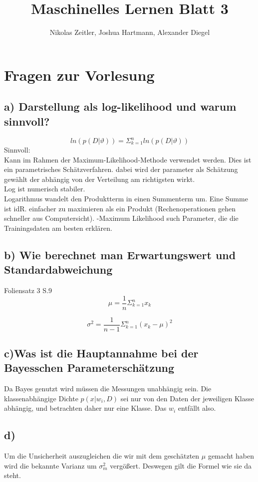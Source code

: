 \documentclass{scrartcl}
\author{Nikolas Zeitler, Joshua Hartmann, Alexander Diegel}
\title{Maschinelles Lernen Blatt 3}
\begin{document}
\maketitle
\section{Fragen zur Vorlesung}
\subsection*{a) Darstellung als log-likelihood und warum sinnvoll?}
\[ ln (p(D|\vartheta)) = \Sigma^n_{k=1} ln (p(D|\vartheta)) \]
Sinnvoll: \\
Kann im Rahmen der Maximum-Likelihood-Methode verwendet werden. Dies ist ein parametrisches Schätzverfahren. dabei wird der parameter als Schätzung gewählt der abhängig von der Verteilung am richtigsten wirkt.\\
Log ist numerisch stabiler.  \\
Logarithmus wandelt den Produktterm in einen Summenterm um. Eine Summe ist idR. einfacher zu maximieren 
als ein Produkt (Rechenoperationen gehen schneller aus Computersicht). -Maximum Likelihood such Parameter, die die Trainingsdaten am besten erklären.
\subsection*{b) Wie berechnet man Erwartungswert und Standardabweichung}
Foliensatz 3 S.9 \\
\[\mu = \frac{1}{n}\Sigma^n_{k=1}x_k \]

\[\sigma^2 = \frac{1}{n-1}\Sigma^n_{k=1}(x_k-\mu)^2 \]

\subsection*{c)Was ist die Hauptannahme bei der Bayesschen Parameterschätzung}
Da Bayes genutzt wird müssen die Messungen unabhängig sein.%
Die klassenabhängige Dichte $p(x|w_i,D)$ sei nur von den Daten der jeweiligen Klasse abhängig, und betrachten daher nur eine Klasse. Das $w_i$ entfällt also.
\subsection*{d)}
Um die Unsicherheit auszugleichen die wir mit dem geschätzten $\mu$ gemacht haben wird die bekannte Varianz um $\sigma_m^2$ vergößert. Deswegen gilt die Formel wie sie da steht.
\end{document}
